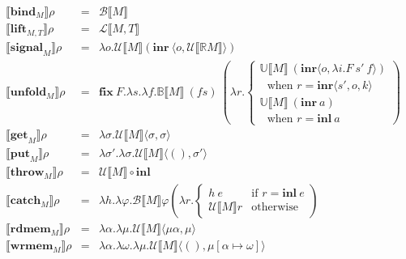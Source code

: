 \documentclass{article}[11pt]
\begin{document}
\begin{eqnarray*}
\llbracket{}\mathbf{bind}_M\rrbracket{}\rho &=& \mathcal{B}\llbracket{}M\rrbracket\\
\llbracket{}\mathbf{lift}_{M,T}\rrbracket\rho &=& \mathcal{L}\llbracket{}M,T\rrbracket\\
\llbracket{}\mathbf{signal}_M\rrbracket\rho &=& \lambda o . \mathcal{U}\llbracket{}M\rrbracket(\mathbf{inr}~ \langle o,\mathcal{U}\llbracket{}\mathbb{R}M\rrbracket\rangle)\\
\llbracket{}\mathbf{unfold}_M\rrbracket\rho &=& \mathbf{fix}~ F . \lambda s . \lambda f . \mathbb{B}\llbracket{}M\rrbracket~(f s)~ \left(\lambda r . \begin{cases}\mathbb{U}\llbracket{}M\rrbracket~ (\mathbf{inr} \langle{}o,\lambda i . F~ s'~ f\rangle{})\\~~~\text{when } r = \mathbf{inr}\langle{}s',o,k\rangle\\\mathbb{U}\llbracket{}M\rrbracket~ (\mathbf{inr}~ a)\\~~~\text{when } r = \mathbf{inl}~ a\end{cases}\right)\\
\llbracket{}\mathbf{get}_M\rrbracket\rho &=& \lambda \sigma . \mathcal{U}\llbracket{}M\rrbracket\langle\sigma,\sigma\rangle\\
\llbracket{}\mathbf{put}_M\rrbracket\rho &=& \lambda \sigma' . \lambda \sigma . \mathcal{U}\llbracket{}M\rrbracket\langle(),\sigma'\rangle\\
\llbracket{}\mathbf{throw}_M\rrbracket\rho &=& \mathcal{U}\llbracket{}M\rrbracket \circ \mathbf{inl}\\
\llbracket{}\mathbf{catch}_M\rrbracket\rho &=& \lambda h . \lambda \varphi . \mathcal{B}\llbracket{}M\rrbracket\varphi\left(\lambda r . \begin{cases}
                                                                                                                                               h~ e&\text{if }r = \mathbf{inl}~ e\\
                                                                                                                                               \mathcal{U}\llbracket{}M\rrbracket r&\text{otherwise}
                                                                                                                                              \end{cases}\right)\\
\llbracket{}\mathbf{rdmem}_M\rrbracket\rho &=& \lambda \alpha . \lambda \mu . \mathcal{U}\llbracket{}M\rrbracket \langle\mu\alpha,\mu\rangle\\
\llbracket{}\mathbf{wrmem}_M\rrbracket\rho &=& \lambda \alpha . \lambda \omega . \lambda \mu . \mathcal{U}\llbracket{}M\rrbracket \langle(),\mu[\alpha \mapsto \omega]\rangle
\end{eqnarray*}
\end{document}

